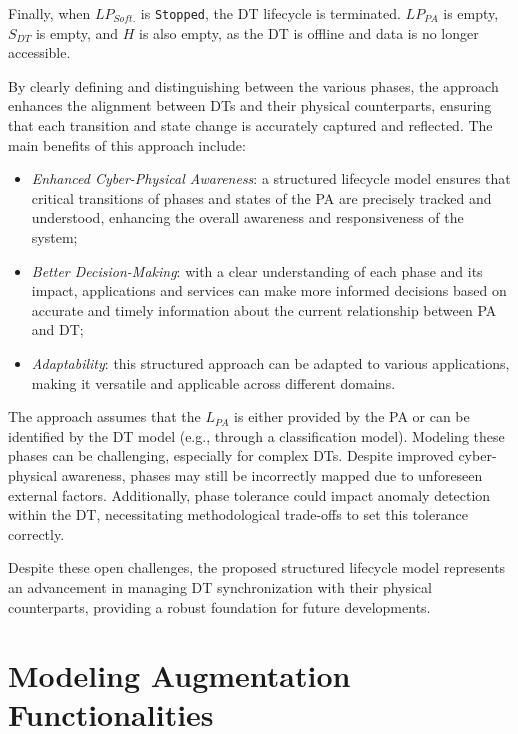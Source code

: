 Finally, when $LP_{Soft.}$ is \texttt{Stopped}, the \ac{DT} lifecycle is terminated. $LP_{PA}$ is empty, $S_{DT}$ is empty, and $H$ is also empty, as the \ac{DT} is offline and data is no longer accessible.

By clearly defining and distinguishing between the various phases, the approach enhances the alignment between \ac{DT}s and their physical counterparts, ensuring that each transition and state change is accurately captured and reflected.
The main benefits of this approach include: 
\begin{itemize}
    \item \textit{Enhanced Cyber-Physical Awareness}: a structured lifecycle model ensures that critical transitions of phases and states of the \ac{PA} are precisely tracked and understood, enhancing the overall awareness and responsiveness of the system;
    \item \textit{Better Decision-Making}: with a clear understanding of each phase and its impact, applications and services can make more informed decisions based on accurate and timely information about the current relationship between \ac{PA} and \ac{DT};
    \item \textit{Adaptability}: this structured approach can be adapted to various applications, making it versatile and applicable across different domains.
\end{itemize}

The approach assumes that the $L_{PA}$ is either provided by the \ac{PA} or can be identified by the \ac{DT} model (e.g., through a classification model).
Modeling these phases can be challenging, especially for complex \acp{DT}.
Despite improved cyber-physical awareness, phases may still be incorrectly mapped due to unforeseen external factors.
Additionally, phase tolerance could impact anomaly detection within the DT, necessitating methodological trade-offs to set this tolerance correctly.

Despite these open challenges, the proposed structured lifecycle model represents an advancement in managing \ac{DT} synchronization with their physical counterparts, providing a robust foundation for future developments.

\section{Modeling Augmentation Functionalities}
\label{sec:dte:engineering-dt:dt-augmentation}

